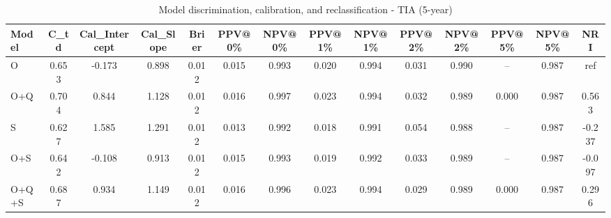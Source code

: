 \begin{table}[htbp]
\centering
\small
\caption{Model discrimination, calibration, and reclassification - TIA (5-year)}
\label{tab:perf_tia_5y}
\begin{tabular}{lccccccccccccc}
\toprule
Model & C\_td & Cal\_Intercept & Cal\_Slope & Brier & PPV@0\% & NPV@0\% & PPV@1\% & NPV@1\% & PPV@2\% & NPV@2\% & PPV@5\% & NPV@5\% & NRI \\
\midrule
O & 0.653 & -0.173 & 0.898 & 0.012 & 0.015 & 0.993 & 0.020 & 0.994 & 0.031 & 0.990 & -- & 0.987 & ref \\
O+Q & 0.704 & 0.844 & 1.128 & 0.012 & 0.016 & 0.997 & 0.023 & 0.994 & 0.032 & 0.989 & 0.000 & 0.987 & 0.563 \\
S & 0.627 & 1.585 & 1.291 & 0.012 & 0.013 & 0.992 & 0.018 & 0.991 & 0.054 & 0.988 & -- & 0.987 & -0.237 \\
O+S & 0.642 & -0.108 & 0.913 & 0.012 & 0.015 & 0.993 & 0.019 & 0.992 & 0.033 & 0.989 & -- & 0.987 & -0.097 \\
O+Q+S & 0.687 & 0.934 & 1.149 & 0.012 & 0.016 & 0.996 & 0.023 & 0.994 & 0.029 & 0.989 & 0.000 & 0.987 & 0.296 \\
\bottomrule
\end{tabular}
\end{table}
